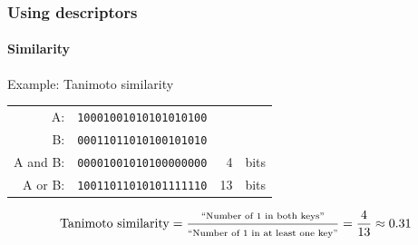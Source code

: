 \documentclass[aspectratio=169]{beamer}
\begin{document}
    \begin{frame}
        \frametitle{Using descriptors}
        \framesubtitle{Similarity}
        \begin{block}{Example: Tanimoto similarity}
        \centering
            \begin{tabular}{rlr@{ }l}
            \toprule
            A:       & \texttt{10001001010101010100} \\
            B:       & \texttt{00011011010100101010} \\ [5pt]
            A and B: & \texttt{00001001010100000000} & 4&bits \\ [5pt]
            A or B:  & \texttt{10011011010101111110} & 13&bits \\
            \bottomrule
            \end{tabular}
            {\small\begin{equation*}
                \text{Tanimoto similarity}=\frac{\text{\scriptsize``Number of 1 in both keys''}}{\text{\scriptsize``Number of 1 in at least one key''}}=\frac{4}{13}\approx0.31
            \end{equation*}}
        \end{block}
    \end{frame}
\end{document}
